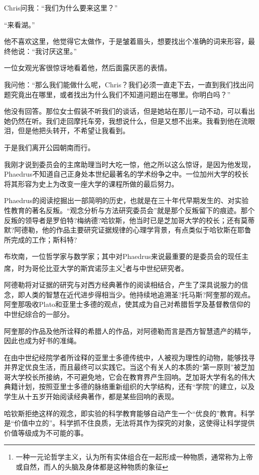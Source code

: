 \documentclass[UTF8]{article}
\begin{document}
\par Chris问我：“我们为什么要来这里？”
\par “来看湖。”
\par 他不喜欢这里，他觉得它太做作，于是皱着眉头，想要找出个准确的词来形容，最终他说：“我讨厌这里。”
\par 一位女观光客很惊讶地看着他，然后面露厌恶的表情。
\par 我问他：“那么我们能做什么呢，Chris？我们必须一直走下去，一直到我们找出问题究竟出在哪里，或者找出为什么我们不知道问题出在哪里。你明白吗？”
\par 他没有回答。那位女士假装不听我们的谈话，但是她站在那儿一动不动，可以看出她仍然在听。我们走回摩托车旁，我想说什么，但是又想不出来。我看到他在流眼泪，但是他把头转开，不希望让我看到。
\par 于是我们离开公园朝南而行。
\par 我刚才说到委员会的主席助理当时大吃一惊，他之所以这么惊讶，是因为他发现，Phaedrus不知道自己正身处本世纪最著名的学术纷争之中。一位加州大学的校长将其形容为史上为改变一座大学的课程所做的最后努力。
\par Phaedrus的阅读挖掘出一部简明的历史，也就是在三十年代早期发生的、对实验性教育的著名反叛。“观念分析与方法研究委员会”就是那个反叛留下的痕迹。那个反叛的领导者是罗伯特?梅纳德?哈钦斯，他当时已是芝加哥大学的校长；还有莫蒂默?阿德勒，他的作品主要研究证据规律的心理学背景，有点类似于哈钦斯在耶鲁所完成的工作；斯科特?
\par 布坎南，一位哲学家与数学家；其中对Phaedrus来说最重要的是委员会的现任主席，时为哥伦比亚大学的斯宾诺莎主义\footnote{一种一元论哲学主义，认为所有实体组合在一起形成一种物质，通常称为上帝或自然，而人的头脑及身体都是这种物质的象征}者与中世纪研究者。
\par 阿德勒将对证据的研究与对西方经典著作的阅读相结合，产生了深具说服力的信念，即人类的智慧在近代进步得相当少。他持续地追溯圣?托马斯?阿奎那的观点。阿奎那吸收Plato和亚里士多德的观点，使其成为自己对希腊哲学及基督教信仰的中世纪综合的一部分。
\par 阿奎那的作品及他所诠释的希腊人的作品，对阿德勒而言是西方智慧遗产的精华，因此也成为好书的准绳。
\par 在由中世纪经院学者所诠释的亚里士多德传统中，人被视为理性的动物，能够找寻并界定优良生活，而且最终可以实践它。当这个有关人的本质的“第一原则”被芝加哥大学校长所接纳，不可避免地，它会在教育界产生回响。芝加哥大学有名的伟大典籍计划，按照亚里士多德的脉络重新组织的大学结构，还有“学院”的建立，以及学生从十五岁开始阅读经典著作，都是某些回响的表现。
\par 哈钦斯拒绝这样的观念，即实验的科学教育能够自动产生一个“优良的”教育。科学是“价值中立的”。科学抓不住良质，无法将其作为探究的对象，这使得让科学提供价值等级成为不可能的事。
\end{document}
